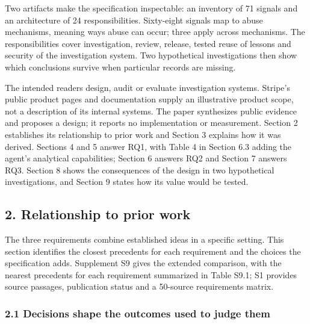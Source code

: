 \documentclass[
  11pt,
]{article}
\begin{document}
Two artifacts make the specification inspectable: an inventory of 71
signals and an architecture of 24 responsibilities. Sixty-eight signals
map to abuse mechanisms, meaning ways abuse can occur; three apply
across mechanisms. The responsibilities cover investigation, review,
release, tested reuse of lessons and security of the investigation
system. Two hypothetical investigations then show which conclusions
survive when particular records are missing.

The intended readers design, audit or evaluate investigation systems.
Stripe's public product pages and documentation supply an illustrative
product scope, not a description of its internal systems. The paper
synthesizes public evidence and proposes a design; it reports no
implementation or measurement. Section 2 establishes its relationship to
prior work and Section 3 explains how it was derived. Sections 4 and 5
answer RQ1, with Table 4 in Section 6.3 adding the agent's analytical
capabilities; Section 6 answers RQ2 and Section 7 answers RQ3. Section 8
shows the consequences of the design in two hypothetical investigations,
and Section 9 states how its value would be tested.

\FloatBarrier

\hypertarget{relationship-to-prior-work}{%
\subsection{2. Relationship to prior
work}\label{relationship-to-prior-work}}

\suppressfloats[t]

The three requirements combine established ideas in a specific setting.
This section identifies the closest precedents for each requirement and
the choices the specification adds. Supplement S9 gives the extended
comparison, with the nearest precedents for each requirement summarized
in Table S9.1; S1 provides source passages, publication status and a
50-source requirements matrix.

\hypertarget{decisions-shape-the-outcomes-used-to-judge-them}{%
\subsubsection{2.1 Decisions shape the outcomes used to judge
them}\label{decisions-shape-the-outcomes-used-to-judge-them}}
\end{document}
